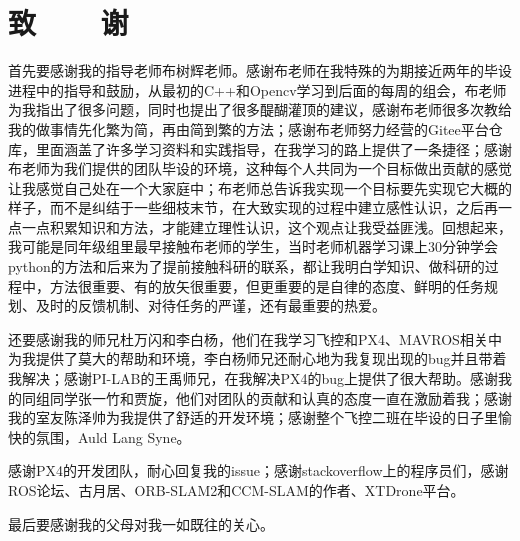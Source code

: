 

\renewcommand{\baselinestretch}{1.5}
\fontsize{12pt}{13pt}\selectfont

\chapter*{致~~~~谢}

首先要感谢我的指导老师布树辉老师。感谢布老师在我特殊的为期接近两年的毕设进程中的指导和鼓励，从最初的C++和Opencv学习到后面的每周的组会，布老师为我指出了很多问题，同时也提出了很多醍醐灌顶的建议，感谢布老师很多次教给我的做事情先化繁为简，再由简到繁的方法；感谢布老师努力经营的Gitee平台仓库，里面涵盖了许多学习资料和实践指导，在我学习的路上提供了一条捷径；感谢布老师为我们提供的团队毕设的环境，这种每个人共同为一个目标做出贡献的感觉让我感觉自己处在一个大家庭中；布老师总告诉我实现一个目标要先实现它大概的样子，而不是纠结于一些细枝末节，在大致实现的过程中建立感性认识，之后再一点一点积累知识和方法，才能建立理性认识，这个观点让我受益匪浅。回想起来，我可能是同年级组里最早接触布老师的学生，当时老师机器学习课上30分钟学会python的方法和后来为了提前接触科研的联系，都让我明白学知识、做科研的过程中，方法很重要、有的放矢很重要，但更重要的是自律的态度、鲜明的任务规划、及时的反馈机制、对待任务的严谨，还有最重要的热爱。

还要感谢我的师兄杜万闪和李白杨，他们在我学习飞控和PX4、MAVROS相关中为我提供了莫大的帮助和环境，李白杨师兄还耐心地为我复现出现的bug并且带着我解决；感谢PI-LAB的王禹师兄，在我解决PX4的bug上提供了很大帮助。感谢我的同组同学张一竹和贾旋，他们对团队的贡献和认真的态度一直在激励着我；感谢我的室友陈泽帅为我提供了舒适的开发环境；感谢整个飞控二班在毕设的日子里愉快的氛围，Auld Lang Syne。

感谢PX4的开发团队，耐心回复我的issue；感谢stackoverflow上的程序员们，感谢ROS论坛、古月居、ORB-SLAM2和CCM-SLAM的作者、XTDrone平台。

最后要感谢我的父母对我一如既往的关心。
